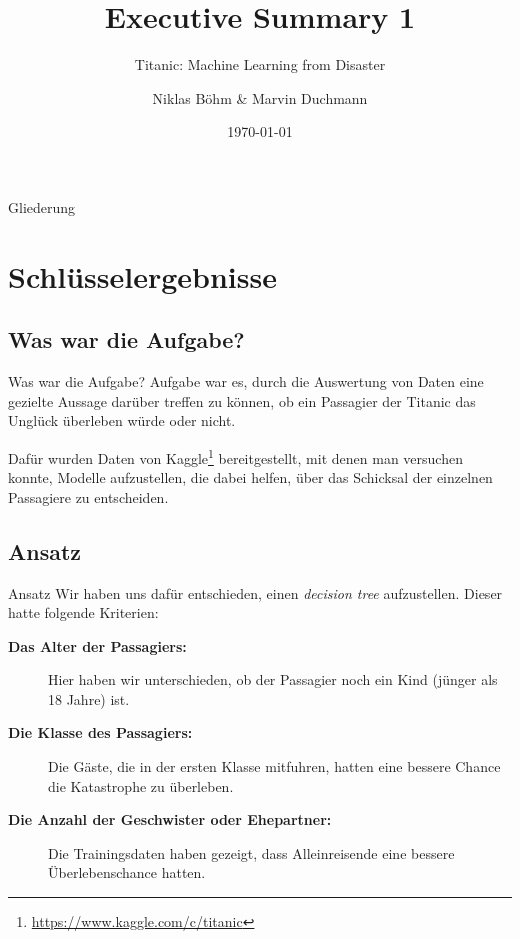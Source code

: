 \documentclass[compress]{beamer}
\title{Executive Summary 1}
\subtitle{Titanic: Machine Learning from Disaster}
\author{Niklas Böhm \& Marvin Duchmann}
\institute{%
\begin{tabular}{r l } %
    Fachbereich & {\Medium DCSM} \\
    Studiengang & {\Medium Angewandte Informatik}
\end{tabular}%
}
\date{\today}
\begin{document}
\maketitle

\begin{frame}{Gliederung}
  \tableofcontents[hideallsubsections]
\end{frame}

\section{Schlüsselergebnisse}
\label{sec:schluesselergebnisse}

\subsection{Was war die Aufgabe?}
\label{subsec:aufg}

\begin{frame}{Was war die Aufgabe?}
  Aufgabe war es, durch die Auswertung von Daten eine gezielte Aussage
  darüber treffen zu können, ob ein Passagier der Titanic das Unglück
  überleben würde oder nicht.

  \bigskip Dafür wurden Daten von
  Kaggle\footnote{\url{https://www.kaggle.com/c/titanic}}
  bereitgestellt, mit denen man versuchen konnte, Modelle
  aufzustellen, die dabei helfen, über das Schicksal der einzelnen
  Passagiere zu entscheiden.
\end{frame}

\subsection{Ansatz}
\label{subsec:ansatz}

\begin{frame}{Ansatz}
  Wir haben uns dafür entschieden, einen \textit{decision tree} aufzustellen.
  Dieser hatte folgende Kriterien:

  \begin{description}
  \item[{\textbf{Das Alter der Passagiers:}}] Hier haben wir unterschieden, ob der
    Passagier noch ein Kind (jünger als 18 Jahre) ist.
  \item[{\textbf{Die Klasse des Passagiers:}}] Die Gäste, die in der ersten Klasse
    mitfuhren, hatten eine bessere Chance die Katastrophe zu überleben.
  \item[{\textbf{Die Anzahl der Geschwister oder Ehepartner:}}] Die Trainingsdaten
    haben gezeigt, dass Alleinreisende eine bessere
    Überlebenschance hatten.
  \end{description}

\end{frame}
\end{document}
